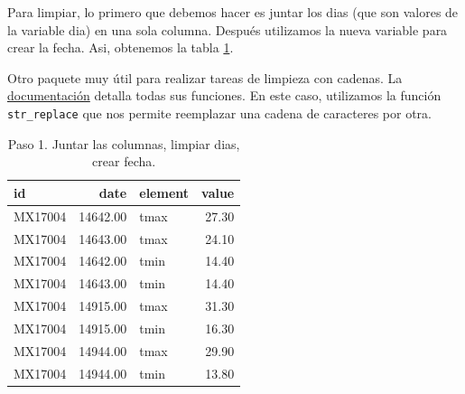 \documentclass[]{article}
\newenvironment{Shaded}{\begin{snugshade}}{\end{snugshade}}
\newcommand{\KeywordTok}[1]{\textcolor[rgb]{0.13,0.29,0.53}{\textbf{#1}}}
\newcommand{\DataTypeTok}[1]{\textcolor[rgb]{0.13,0.29,0.53}{#1}}
\newcommand{\StringTok}[1]{\textcolor[rgb]{0.31,0.60,0.02}{#1}}
\newcommand{\CommentTok}[1]{\textcolor[rgb]{0.56,0.35,0.01}{\textit{#1}}}
\newcommand{\OperatorTok}[1]{\textcolor[rgb]{0.81,0.36,0.00}{\textbf{#1}}}
\newcommand{\NormalTok}[1]{#1}
\begin{document}
Para limpiar, lo primero que debemos hacer es juntar los dias (que son
valores de la variable dia) en una sola columna. Después utilizamos la
nueva variable para crear la fecha. Asi, obtenemos la tabla
\ref{tab:clima1}.

\begin{Shaded}
\end{Shaded}

\begin{nota}[stringr]
Otro paquete muy útil para realizar tareas de limpieza con cadenas. 
La \href{https://cran.r-project.org/web/packages/stringr/stringr.pdf}{documentación}
detalla todas sus funciones. En este caso, utilizamos la función \texttt{str\_replace}
que nos permite reemplazar una cadena de caracteres por otra.
\end{nota}

\begin{table}[ht]
\centering
\begin{tabular}{lrlr}
  \hline
id & date & element & value \\ 
  \hline
MX17004 & 14642.00 & tmax & 27.30 \\ 
  MX17004 & 14643.00 & tmax & 24.10 \\ 
  MX17004 & 14642.00 & tmin & 14.40 \\ 
  MX17004 & 14643.00 & tmin & 14.40 \\ 
  MX17004 & 14915.00 & tmax & 31.30 \\ 
  MX17004 & 14915.00 & tmin & 16.30 \\ 
  MX17004 & 14944.00 & tmax & 29.90 \\ 
  MX17004 & 14944.00 & tmin & 13.80 \\ 
   \hline
\end{tabular}
\caption{Paso 1. Juntar las columnas, limpiar dias, crear fecha.} 
\label{tab:clima1}
\end{table}
\end{document}
